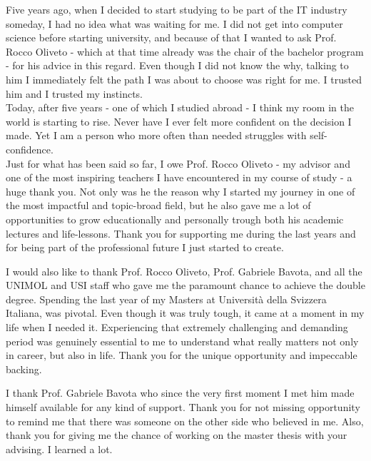 \begin{acknowledgements}

\addchaptertocentry{\acknowledgementname}
Five years ago, when I decided to start studying to be part of the IT industry someday, 
I had no idea what was waiting for me. 
I did not get into computer science before starting university, and because of that 
I wanted to ask Prof. Rocco Oliveto - which at that time already was the chair of the bachelor program - for his advice 
in this regard. Even though I did not know the why, talking to him I immediately felt the path I was about to choose was right for me. 
I trusted him and I trusted my instincts. \\
Today, after five years - one of which I studied abroad - I think my room in the world is starting to rise.
Never have I ever felt more confident on the decision I made. Yet I am a person who more often than needed struggles with self-confidence.\\

Just for what has been said so far, I owe Prof. Rocco Oliveto - my advisor and one of the most inspiring teachers I have encountered
in my course of study - a huge thank you. Not only was he the reason why I started my journey in one of the most impactful and topic-broad field, 
but he also gave me a lot of opportunities to grow educationally and personally trough both his academic lectures and life-lessons.
Thank you for supporting me during the last years and for being part of the professional future I just started to create.

I would also like to thank Prof. Rocco Oliveto, Prof. Gabriele Bavota, and all the UNIMOL and USI staff who gave me the paramount chance to 
achieve the double degree. 
Spending the last year of my Masters at Università della Svizzera Italiana, was pivotal. Even though it was
truly tough, it came at a moment in my life when I needed it. 
Experiencing that extremely challenging and demanding 
period was genuinely essential to me to understand what really matters not only in career, but also in life. Thank you 
for the unique opportunity and impeccable backing.

I thank Prof. Gabriele Bavota who since the very first moment I met him made himself available for any kind of support. 
Thank you for not missing opportunity to remind me that there was someone on the other side who believed in me. Also, thank you 
for giving me the chance of working on the master thesis with your advising. I learned a lot.


\end{acknowledgements}
